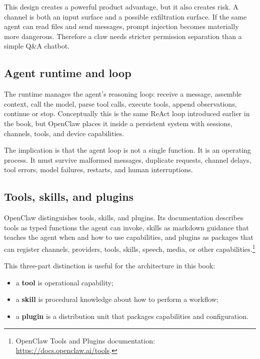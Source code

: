 This design creates a powerful product advantage, but it also creates risk. A channel is both an input surface and a possible exfiltration surface. If the same agent can read files and send messages, prompt injection becomes materially more dangerous. Therefore a claw needs stricter permission separation than a simple Q\&A chatbot.

\subsection{Agent runtime and loop}

The runtime manages the agent's reasoning loop: receive a message, assemble context, call the model, parse tool calls, execute tools, append observations, continue or stop. Conceptually this is the same ReAct loop introduced earlier in the book, but OpenClaw places it inside a persistent system with sessions, channels, tools, and device capabilities.

The implication is that the agent loop is not a single function. It is an operating process. It must survive malformed messages, duplicate requests, channel delays, tool errors, model failures, restarts, and human interruptions.

\subsection{Tools, skills, and plugins}

OpenClaw distinguishes tools, skills, and plugins. Its documentation describes tools as typed functions the agent can invoke, skills as markdown guidance that teaches the agent when and how to use capabilities, and plugins as packages that can register channels, providers, tools, skills, speech, media, or other capabilities.\footnote{OpenClaw Tools and Plugins documentation: \url{https://docs.openclaw.ai/tools}.}

This three-part distinction is useful for the architecture in this book:

\begin{itemize}[leftmargin=*]
  \item a \textbf{tool} is operational capability;
  \item a \textbf{skill} is procedural knowledge about how to perform a workflow;
  \item a \textbf{plugin} is a distribution unit that packages capabilities and configuration.
\end{itemize}

